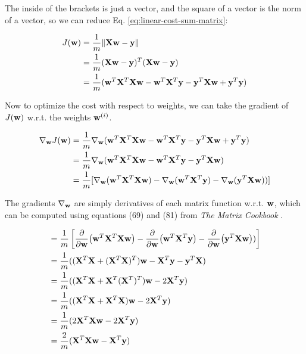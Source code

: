 \documentclass[11pt]{article}
\begin{document}
\begin{enumerate}[start=1,label={\bfseries Question \arabic*:},leftmargin=1in]
        The inside of the brackets is just a vector, and the square of a vector is the norm of a vector, so we can reduce Eq. \ref{eq:linear-cost-sum-matrix}:

        \begin{align}
            J(\vb{w}) &= \frac{1}{m} \norm{ \vb{Xw} - \vb{y}  } \\
                      &= \frac{1}{m} (\vb{Xw} - \vb{y})^T(\vb{Xw} - \vb{y}) \\
                      &= \frac{1}{m} ( \vb{w}^T\vb{X}^T\vb{Xw} - \vb{w}^T\vb{X}^T\vb{y} - \vb{y}^T \vb{Xw} + \vb{y}^T\vb{y} )
        \end{align}

        Now to optimize the cost with respect to weights, we can take the gradient of \(J(\vb{w})\) w.r.t. the weights \(\vb{w}^{(i)}\).

        \begin{align}
            \nabla_{\vb{w}} J(\vb{w}) &= \frac{1}{m} \nabla_{\vb{w}} (  \vb{w}^T\vb{X}^T\vb{Xw} - \vb{w}^T\vb{X}^T\vb{y} - \vb{y}^T \vb{Xw} + \vb{y}^T\vb{y} ) \\
                                      &= \frac{1}{m} \nabla_{\vb{w}} (  \vb{w}^T\vb{X}^T\vb{Xw} - \vb{w}^T\vb{X}^T\vb{y} - \vb{y}^T \vb{Xw}  ) \\
                                      &= \frac{1}{m} [ \nabla_{\vb{w}} (  \vb{w}^T\vb{X}^T\vb{Xw } ) - \nabla_{\vb{w}} ( \vb{w}^T\vb{X}^T\vb{y} ) - \nabla_{\vb{w}} ( \vb{y}^T \vb{Xw}  ) ) ]
        \end{align}

        The gradients \(\nabla_{\vb{w}}\) are simply derivatives of each matrix function w.r.t. \(\vb{w}\), which can be computed using equations (69) and (81) from \emph{The Matrix Cookbook} \cite{matrixcookbook}.

        \begin{align}
            &= \frac{1}{m} \left[ \pdv{\vb{w}} (  \vb{w}^T\vb{X}^T\vb{Xw } ) - \pdv{\vb{w}} ( \vb{w}^T\vb{X}^T\vb{y} ) - \pdv{\vb{w}} ( \vb{y}^T \vb{Xw}  ) ) \right] \\
            &= \frac{1}{m} ( (\vb{X}^T\vb{X} + ( \vb{X}^T\vb{X} )^T )\vb{w} - \vb{X}^T\vb{y} - \vb{y}^T\vb{X} ) \\
            &= \frac{1}{m} ( (\vb{X}^T\vb{X} + \vb{X}^T ( \vb{X}^T )^T )\vb{w} - 2\vb{X}^T\vb{y} ) \\
            &= \frac{1}{m} ( (\vb{X}^T\vb{X} + \vb{X}^T\vb{X})\vb{w} - 2\vb{X}^T\vb{y} ) \\
            &= \frac{1}{m} (2\vb{X}^T\vb{X}\vb{w} - 2\vb{X}^T\vb{y} ) \\
            &= \frac{2}{m} (\vb{X}^T\vb{X}\vb{w} - \vb{X}^T\vb{y} )
        \end{align}


\end{enumerate}
\end{document}
